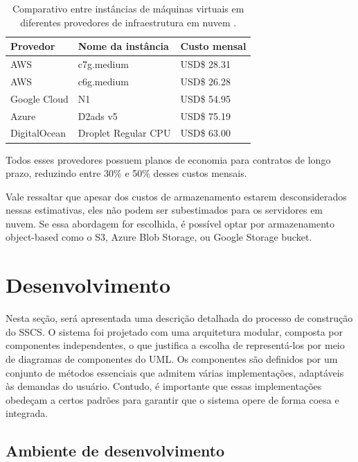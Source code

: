 \documentclass[12pt, %
openright, 
oneside, %
a4paper,    %
brazil]{facom-ufu-abntex2}
\begin{document}
\begin{table}[ht]
	\centering
	\caption{Comparativo entre instâncias de máquinas virtuais em
		diferentes provedores de infraestrutura em nuvem \cite{awsCalc,gcpCalc,azureCalc}.}
	\label{tab:estima}
	\begin{tabular}{|l|l|l|}
		\hline
		Provedor     & Nome da instância   & Custo mensal
		\\ \hline
		AWS          & c7g.medium          & USD\$ 28.31
		\\ \hline
		AWS          & c6g.medium          & USD\$ 26.28
		\\ \hline
		Google Cloud & N1                  & USD\$ 54.95
		\\ \hline
		Azure        & D2ads v5            & USD\$ 75.19
		\\ \hline
		DigitalOcean & Droplet Regular CPU & USD\$ 63.00
		\\ \hline
	\end{tabular}
\end{table}

Todos esses provedores possuem planos de economia para contratos de longo
prazo, reduzindo entre 30\% e 50\% desses custos mensais.

Vale ressaltar que apesar dos custos de armazenamento estarem desconsiderados
nessas estimativas, eles não podem ser subestimados para os servidores em
nuvem. Se essa abordagem for escolhida, é possível optar por armazenamento
object-based como o S3, Azure Blob Storage, ou Google Storage bucket.

\chapter{Desenvolvimento}

Nesta seção, será apresentada uma descrição detalhada do processo de construção
do SSCS. O sistema foi projetado com uma arquitetura modular, composta por
componentes independentes, o que justifica a escolha de representá-los por meio
de diagramas de componentes do UML. Os componentes são definidos por um
conjunto de métodos essenciais que admitem várias implementações, adaptáveis às
demandas do usuário. Contudo, é importante que essas implementações obedeçam a
certos padrões para garantir que o sistema opere de forma coesa e integrada.

\section{Ambiente de desenvolvimento}
\label{sec:amb}
\end{document}
